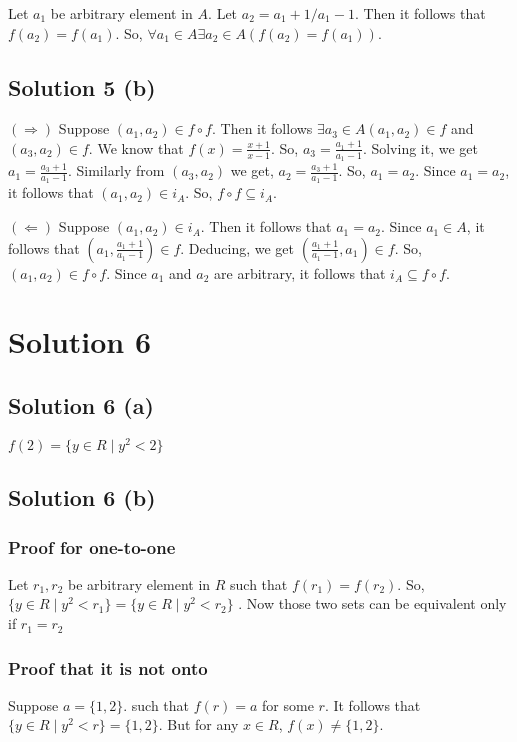 \documentclass{article}
\begin{document}
Let $a_1$ be arbitrary element in $A$. Let $a_2 = a_1 + 1 / a_1 - 1$.
Then it follows that $f(a_2) = f(a_1)$. So, $\forall a_1 \in A \exists
a_2 \in A(f(a_2) = f(a_1))$.

\subsection{Solution 5 (b)}
$(\Rightarrow)$ Suppose $(a_1, a_2) \in f \circ f$. Then it follows
$\exists a_3 \in A (a_1, a_2) \in f$ and $(a_3,a_2) \in f$. We know
that $f(x) = \frac{x + 1}{x - 1}$. So, $a_3 = \frac{a_1 + 1}{a_1 -
  1}$. Solving it, we get $a_1 = \frac{a_3 + 1}{a_1 - 1}$. Similarly
from $(a_3, a_2)$ we get, $a_2 = \frac{a_3 + 1}{a_1 - 1}$. So, $a_1 =
a_2$. Since $a_1 = a_2$, it follows that $(a_1, a_2) \in i_A$. So, $f
\circ f \subseteq i_A$.

$(\Leftarrow)$ Suppose $(a_1, a_2) \in i_A$. Then it follows that $a_1
= a_2$. Since $a_1 \in A$, it follows that $(a_1, \frac{a_1 + 1}{a_1 -
  1}) \in f$. Deducing, we get $(\frac{a_1 + 1}{a_1 - 1}, a_1) \in f$.
So, $(a_1, a_2) \in f \circ f$. Since $a_1$ and $a_2$ are arbitrary,
it follows that $i_A \subseteq f \circ f$.

\section{Solution 6}
\subsection{Solution 6 (a)}
$f(2) = \{y \in R \mid y^2 < 2\}$

\subsection{Solution 6 (b)}
\subsubsection{Proof for one-to-one}
Let $r_1, r_2$ be arbitrary element in $R$ such that $f(r_1) =
f(r_2)$. So, $\{y \in R \mid y^2 < r_1\} = \{y \in R \mid y^2 < r_2\}$
. Now those two sets can be equivalent only if $r_1 = r_2$
\subsubsection{Proof that it is not onto}
Suppose $a = \{1,2\}$. such that $f(r) = a$ for some $r$. It follows
that $\{y \in R \mid y^2 < r\} = \{1,2\}$. But for any $x \in R$,
$f(x) \neq \{1,2\}$.
\end{document}
